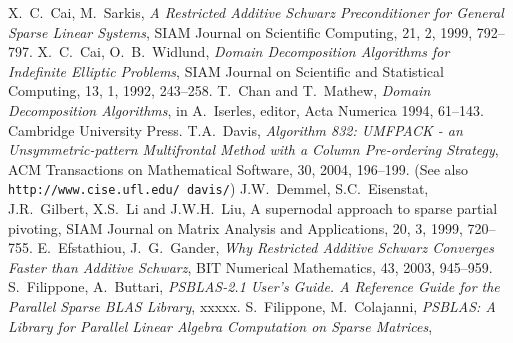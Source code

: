 \begin{thebibliography}{99}
%
%
%
X.~C.~Cai, M.~Sarkis,
{\em A Restricted Additive Schwarz Preconditioner for General Sparse Linear Systems},
SIAM Journal on Scientific Computing, 21, 2, 1999, 792--797.
%
X.~C.~Cai, O.~B.~Widlund,
{\em Domain Decomposition Algorithms for Indefinite Elliptic Problems},
SIAM Journal on Scientific and Statistical Computing, 13, 1, 1992, 243--258.
%
T.~Chan and T.~Mathew,
{\em Domain Decomposition Algorithms},
in A.~Iserles, editor, Acta Numerica 1994, 61--143.
Cambridge University Press.
% 
T.A.~Davis, 
{\em Algorithm 832: UMFPACK - an Unsymmetric-pattern Multifrontal
Method with a Column Pre-ordering Strategy},
ACM Transactions on Mathematical Software, 30, 2004, 196--199.
(See also {\tt http://www.cise.ufl.edu/~davis/})
%
J.W.~Demmel, S.C.~Eisenstat, J.R.~Gilbert, X.S.~Li and J.W.H.~Liu,
A supernodal approach to sparse partial pivoting,
SIAM Journal on Matrix Analysis and Applications, 20, 3, 1999, 720--755.
%
%
%
%
E.~Efstathiou, J.~G.~Gander,
{\em Why Restricted Additive Schwarz Converges Faster than Additive Schwarz},
BIT Numerical Mathematics, 43, 2003, 945--959.
%
S.~Filippone, A.~Buttari, 
{\em PSBLAS-2.1 User's Guide. A Reference Guide for the Parallel Sparse BLAS Library},
xxxxx.
%
S.~Filippone, M.~Colajanni, 
{\em PSBLAS: A Library for Parallel Linear Algebra
Computation on Sparse Matrices},

\end{thebibliography}
